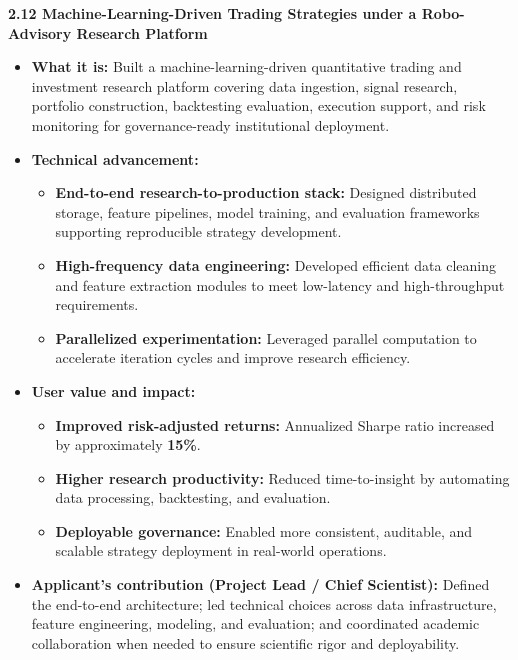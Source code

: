 \documentclass[11pt]{article}
\newcommand{\CVSubsection}[1]{\textbf{#1}\par}
\newenvironment{tightitemize}{%
  \begin{itemize}[leftmargin=*,nosep,topsep=2pt]
}{\end{itemize}}
\begin{document}
\vspace{0.8em}

\CVSubsection{2.12 Machine-Learning-Driven Trading Strategies under a Robo-Advisory Research Platform}

\begin{tightitemize}
  \item \textbf{What it is:} Built a machine-learning-driven quantitative trading and investment research platform covering data ingestion, signal research, portfolio construction, backtesting evaluation, execution support, and risk monitoring for governance-ready institutional deployment.
  \item \textbf{Technical advancement:}
  \begin{tightitemize}
    \item \textbf{End-to-end research-to-production stack:} Designed distributed storage, feature pipelines, model training, and evaluation frameworks supporting reproducible strategy development.
    \item \textbf{High-frequency data engineering:} Developed efficient data cleaning and feature extraction modules to meet low-latency and high-throughput requirements.
    \item \textbf{Parallelized experimentation:} Leveraged parallel computation to accelerate iteration cycles and improve research efficiency.
  \end{tightitemize}
  \item \textbf{User value and impact:}
  \begin{tightitemize}
    \item \textbf{Improved risk-adjusted returns:} Annualized Sharpe ratio increased by approximately \textbf{15\%}.
    \item \textbf{Higher research productivity:} Reduced time-to-insight by automating data processing, backtesting, and evaluation.
    \item \textbf{Deployable governance:} Enabled more consistent, auditable, and scalable strategy deployment in real-world operations.
  \end{tightitemize}
  \item \textbf{Applicant’s contribution (Project Lead / Chief Scientist):} Defined the end-to-end architecture; led technical choices across data infrastructure, feature engineering, modeling, and evaluation; and coordinated academic collaboration when needed to ensure scientific rigor and deployability.
\end{tightitemize}
\end{document}
